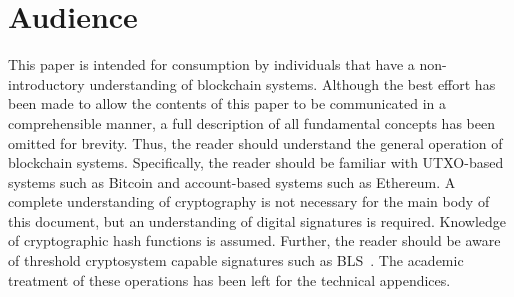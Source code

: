 \section{Audience}

This paper is intended for consumption by individuals that have a
non-introductory understanding of blockchain systems.
Although the best effort has been made to allow the contents of this
paper to be communicated in a comprehensible manner, a full description
of all fundamental concepts has been omitted for brevity.
Thus, the reader should understand the general operation of blockchain
systems.
Specifically, the reader should be familiar with UTXO-based systems
such as Bitcoin and account-based systems such as Ethereum.
A complete understanding of cryptography is not necessary for the main
body of this document, but an understanding of digital signatures is
required.
Knowledge of cryptographic hash functions is assumed.
Further, the reader should be aware of threshold cryptosystem capable
signatures such as BLS~\cite{boneh2001short}.
The academic treatment of these operations has been left for the
technical appendices.
